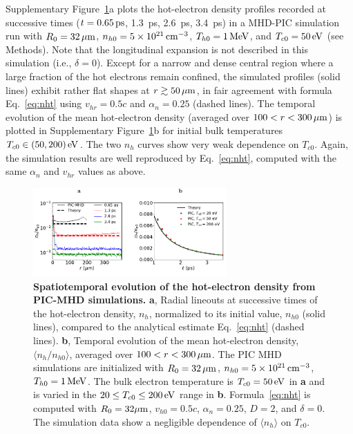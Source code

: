 \documentclass[aps,superscriptaddress]{revtex4}
\begin{document}
Supplementary Figure~\ref{fig:n_param}a plots the hot-electron density profiles recorded at successive times ($t=0.65\,\rm ps$, 1.3~ps, 2.6~ps, 3.4~ps) in a MHD-PIC simulation run with $R_0=32\,\rm \mu m$, $n_{h0}=5\times 10^{21}\,\rm cm^{-3}$, $T_{h0}=1\,\rm MeV$, and $T_{c0}=50\,\rm eV$ (see Methods). Note that the longitudinal expansion is not described in this simulation (i.e., $\delta = 0$). Except for a narrow and dense central region where a large fraction of the hot electrons remain confined, the simulated profiles (solid lines) exhibit rather flat shapes at $r \gtrsim 50\,\rm \mu m$, in fair agreement with formula Eq.~\eqref{eq:nht} using $v_{hr}=0.5c$ and $\alpha_n = 0.25$ (dashed lines). The temporal evolution of the mean hot-electron density (averaged over $100<r<300\,\rm \mu m$) is plotted in Supplementary Figure~\ref{fig:n_param}b for initial bulk temperatures $T_{c0} \in (50,200)\,\rm eV$. The two $n_h$ curves show very weak dependence on $T_{c0}$.
Again, the simulation results are well reproduced by Eq.~\eqref{eq:nht}, computed with the same $\alpha_n$ and $v_{hr}$ values as above.

\begin{figure}[!t]
\centerline{
\includegraphics[width=0.66\textwidth]{FigS7.pdf} }
\caption{\label{fig:n_param} 
{\bf Spatiotemporal evolution of the hot-electron density from PIC-MHD simulations.}
{\bf a}, Radial lineouts at successive times of the hot-electron density, $n_h$, normalized to its initial value, $n_{h0}$ (solid lines), compared to the analytical estimate Eq.~\eqref{eq:nht} (dashed lines).
{\bf b}, Temporal evolution of the mean hot-electron density, $\langle n_h/n_{h0} \rangle$, averaged over $100<r<300\,\rm \mu m$. The PIC MHD simulations are initialized with $R_0=32\,\rm \mu m$, $n_{h0}=5\times 10^{21}\,\rm cm^{-3}$, $T_{h0}=1\,\rm MeV$. The bulk electron temperature is $T_{c0}=50\,\rm eV$ in {\bf a} and is varied in the $20 \le T_{c0} \le 200\,\rm eV$ range in {\bf b}. Formula~\eqref{eq:nht} is computed with $R_0=32\rm \mu m$, $v_{h0}=0.5c$, $\alpha_n=0.25$, $D=2$, and $\delta=0$. The simulation data show a negligible dependence of $\langle n_h \rangle$ on $T_{c0}$.
}
\end{figure}
\end{document}
